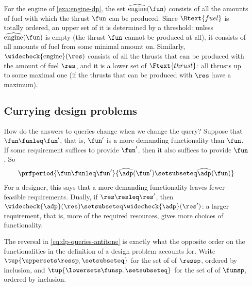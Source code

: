 \begin{example}
    \label{exa:engine-queries}
    For the engine of \cref{exa:engine-dp}, the set $\widehat{\text{engine}}(\fun)$ consists of all the amounts of fuel with which the thrust $\fun$ can be produced.
    Since $\Rtext{fuel}$ is totally ordered, an upper set of it is determined by a threshold: unless $\widehat{\text{engine}}(\fun)$ is empty (the thrust $\fun$ cannot be produced at all), it consists of all amounts of fuel from some minimal amount on.
    Similarly, $\widecheck{\text{engine}}(\res)$ consists of all the thrusts that can be produced with the amount of fuel $\res$, and it is a lower set of $\Ftext{thrust}$: all thrusts up to some maximal one (if the thrusts that can be produced with $\res$ have a maximum).
\end{example}

\subsection{Currying design problems}

How do the answers to queries change when we change the query?
Suppose that $\fun \funleq \fun'$, that is, $\fun'$ is a more demanding functionality than $\fun$.
If some requirement suffices to provide $\fun'$, then it also suffices to provide $\fun$.
So
\begin{equation}\label{eq:dp-queries-antitone}
    \prfperiod{
        \fun \funleq \fun'
    }{
        \widehat{\adp}(\fun') \setsubseteq \widehat{\adp}(\fun)
    }
\end{equation}
For a designer, this says that a more demanding functionality leaves fewer feasible requirements.
Dually, if $\res \resleq \res'$, then $\widecheck{\adp}(\res) \setsubseteq \widecheck{\adp}(\res')$: a larger requirement, that is, more of the required resources, gives more choices of functionality.

The reversal in \cref{eq:dp-queries-antitone} is exactly what the opposite order on the functionalities in the definition of a design problem accounts for.
Write $\tup{\uppersets \ressp, \setsubseteq}$ for the set of  of $\ressp$, ordered by inclusion, and $\tup{\lowersets \funsp, \setsubseteq}$ for the set of  of $\funsp$, ordered by inclusion.

